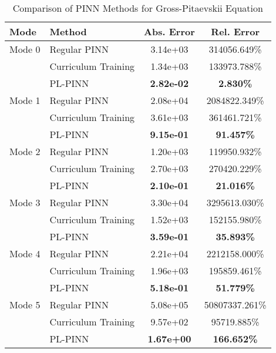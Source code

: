 \begin{table}[htbp]
\centering
\caption{Comparison of PINN Methods for Gross-Pitaevskii Equation}
\label{tab:pinn_comparison}
\begin{tabular}{llcc}
\toprule
Mode & Method & Abs. Error & Rel. Error \\
\midrule
Mode 0 & Regular PINN & 3.14e+03 & 314056.649\% \\
 & Curriculum Training & 1.34e+03 & 133973.788\% \\
 & PL-PINN & \textbf{2.82e-02} & \textbf{2.830\%} \\
\midrule
Mode 1 & Regular PINN & 2.08e+04 & 2084822.349\% \\
 & Curriculum Training & 3.61e+03 & 361461.721\% \\
 & PL-PINN & \textbf{9.15e-01} & \textbf{91.457\%} \\
\midrule
Mode 2 & Regular PINN & 1.20e+03 & 119950.932\% \\
 & Curriculum Training & 2.70e+03 & 270420.229\% \\
 & PL-PINN & \textbf{2.10e-01} & \textbf{21.016\%} \\
\midrule
Mode 3 & Regular PINN & 3.30e+04 & 3295613.030\% \\
 & Curriculum Training & 1.52e+03 & 152155.980\% \\
 & PL-PINN & \textbf{3.59e-01} & \textbf{35.893\%} \\
\midrule
Mode 4 & Regular PINN & 2.21e+04 & 2212158.000\% \\
 & Curriculum Training & 1.96e+03 & 195859.461\% \\
 & PL-PINN & \textbf{5.18e-01} & \textbf{51.779\%} \\
\midrule
Mode 5 & Regular PINN & 5.08e+05 & 50807337.261\% \\
 & Curriculum Training & 9.57e+02 & 95719.885\% \\
 & PL-PINN & \textbf{1.67e+00} & \textbf{166.652\%} \\
\bottomrule
\end{tabular}
\end{table}